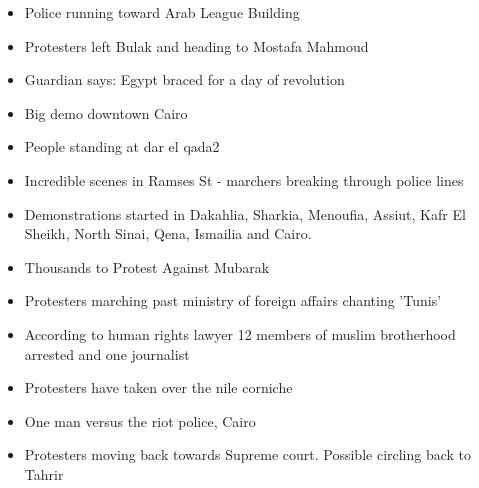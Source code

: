 \begin{itemize}
 \item Police running toward Arab League Building
 \item Protesters left Bulak and heading to Mostafa Mahmoud
 \item Guardian says: Egypt braced for a day of revolution
 \item Big demo downtown Cairo
 \item People standing at dar el qada2
 \item Incredible scenes in Ramses St - marchers breaking through police lines
 \item Demonstrations started in Dakahlia, Sharkia, Menoufia, Assiut, Kafr El Sheikh, North Sinai, Qena, Ismailia and Cairo.
 \item Thousands to Protest Against Mubarak
 \item Protesters marching past ministry of foreign affairs chanting 'Tunis'
 \item According to human rights lawyer 12 members of muslim brotherhood arrested and one journalist
 \item Protesters have taken over the nile corniche
 \item One man versus the riot police, Cairo
 \item Protesters moving back towards Supreme court. Possible circling back to Tahrir 
 
\end{itemize}\vspace{15pt}


